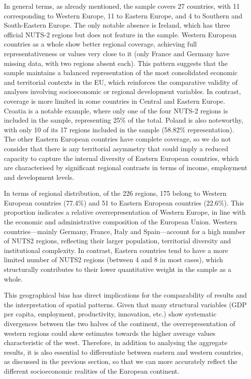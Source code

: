 \documentclass[a4paper,11pt,oneside]{article}
\begin{document}
In general terms, as already mentioned, the sample covers 27 countries, with 11 corresponding to Western Europe, 11 to Eastern Europe, and 4 to Southern and South-Eastern Europe. The only notable absence is Ireland, which has three official NUTS-2 regions but does not feature in the sample. Western European countries as a whole show better regional coverage, achieving full representativeness or values very close to it (only France and Germany have missing data, with two regions absent each). This pattern suggests that the sample maintains a balanced representation of the most consolidated economic and territorial contexts in the EU, which reinforces the comparative validity of analyses involving socioeconomic or regional development variables. In contrast, coverage is more limited in some countries in Central and Eastern Europe. Croatia is a notable example, where only one of the four NUTS-2 regions is included in the sample, representing 25\% of the total. Poland is also noteworthy, with only 10 of its 17 regions included in the sample (58.82\% representation). The other Eastern European countries have complete coverage, so we do not consider that there is any territorial asymmetry that could imply a reduced capacity to capture the internal diversity of Eastern European countries, which are characterised by significant regional contrasts in terms of income, employment and development levels.



In terms of regional distribution, of the 226 regions, 175 belong to Western European countries (77.4\%) and 51 to Eastern European countries (22.6\%). This proportion indicates a relative overrepresentation of Western Europe, in line with the economic and administrative composition of the European Union. Western countries---mainly Germany, France, Italy and Spain---account for a high number of NUTS2 regions, reflecting their larger population, territorial diversity and institutional complexity. In contrast, Eastern countries tend to have a more limited number of NUTS2 regions (between 4 and 8 in most cases), which structurally contributes to their lower quantitative weight in the sample as a whole.


This geographical bias has direct implications for the comparability of results and the interpretation of spatial patterns. Given that many structural variables (GDP per capita, employment, productivity, innovation, etc.) show systematic divergences between the two halves of the continent, the overrepresentation of western regions could skew estimates towards the higher average values characteristic of the west. Therefore, in addition to analysing the aggregate results, it is also essential to differentiate between eastern and western countries, as discussed in the previous section, so that we can more accurately reflect the different socioeconomic realities of the European continent.
\end{document}
